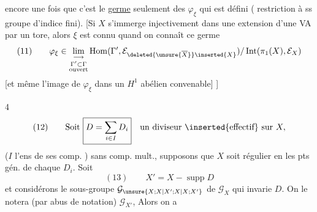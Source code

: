 encore une fois que c'est le \uline{germe}
seulement des $\varphi_\xi$ qui est défini
( restriction à ss groupe d'indice
fini). [Si $X$ s'immerge injectivement
dans une extension d'une VA par un
tore, alors $\xi$ est connu quand on
connaît ce germe
\[
(11)\qquad\varphi_\xi\in\underset{\substack{\Gamma'\subset\Gamma\\\text{ouvert}}}{\lim\limits_{\longrightarrow}}
\operatorname{Hom}(\Gamma',\mathcal E_{\deleted{\unsure{\overline X}}\inserted{X}})
/\operatorname{Int}(\pi_1(X),\mathcal E_X)
\]
[et même l'image de $\varphi_\xi$ dans un $H^1$ abélien
convenable\unsure{\ldots}] ]

\textcircled{4}
\[
(12)\qquad\text{Soit }\boxed{D=\sum_{i\in I}D_i}\quad\text{un diviseur \inserted{effectif} sur }X,
\]
($I$ l'ens de ses comp. ) sans comp. mult.,
supposons que $X$ soit régulier  en les
pts gén. de chaque $D_i$. Soit 
\[
(13)\qquad X'=X-\operatorname{supp}D
\]
et considérons le sous-groupe $\mathcal G_{\unsure{X;X|X';X|X;X'}}$ de
$\mathcal G_X$ qui invarie $D$. On le notera  (par
abus de notation) $\mathcal G_{X'}$,  Alors on a

